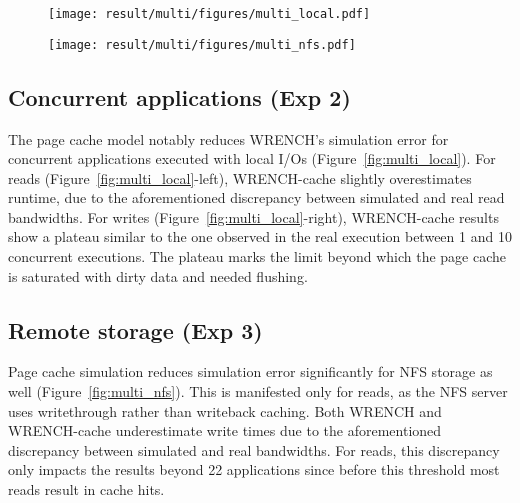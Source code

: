 \documentclass[conference]{IEEEtran}
\newcommand{\wrench}{WRENCH\xspace}
\begin{document}
            \begin{figure*}
                \begin{subfigure}{\linewidth}
                    \centering
                    \texttt{[image: result/multi/figures/multi\_local.pdf]}
                \end{subfigure}
                \caption{Concurrent results with 3~GB files (\textit{Exp 2})}
                \label{fig:multi_local}
            \end{figure*}
            \begin{figure*}
                \begin{subfigure}{\linewidth}
                    \centering
                    \texttt{[image: result/multi/figures/multi\_nfs.pdf]}
                \end{subfigure}
                \caption{NFS results with 3~GB files (\textit{Exp 3})}
                \label{fig:multi_nfs}
                \end{figure*}
        \subsection{Concurrent applications (Exp 2)}

            The page cache model notably reduces \wrench's simulation error
            for concurrent applications executed with local I/Os
            (Figure~\ref{fig:multi_local}). For reads (Figure~\ref{fig:multi_local}-left), \wrench-cache
            slightly overestimates runtime, due to the aforementioned discrepancy between
            simulated and real read bandwidths.
            For writes (Figure~\ref{fig:multi_local}-right), \wrench-cache results show a
            plateau similar to the one observed in the real
            execution between 1 and 10 concurrent executions. The plateau marks the limit beyond which the page cache is
            saturated with dirty data and needed flushing.


        \subsection{Remote storage (Exp 3)}

            Page cache simulation  reduces simulation error significantly for
            NFS storage as well (Figure~\ref{fig:multi_nfs}). This
            is manifested only for reads, as the NFS server uses writethrough rather than writeback caching.
            Both \wrench and \wrench-cache
            underestimate write times due to the aforementioned discrepancy between
            simulated and real bandwidths. For reads,
            this discrepancy only impacts the results beyond 22
            applications since before this threshold most reads result in cache
            hits.
\end{document}
